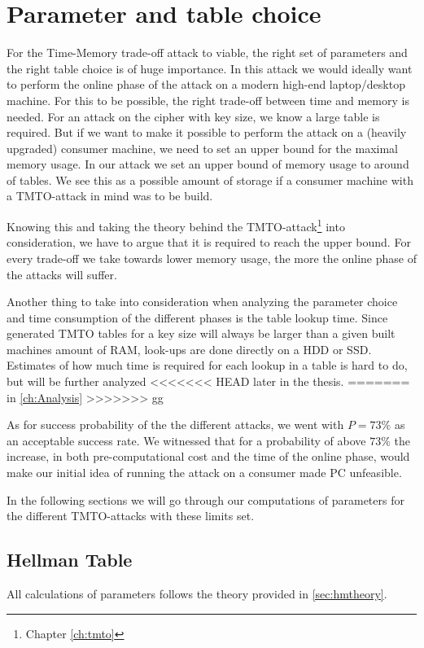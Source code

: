 \chapter{Parameter and table choice}
\label{ch:param}
For the Time-Memory trade-off attack to viable, the right set of
parameters and the right table choice is of huge importance. In this
attack we would ideally want to perform the online phase of the  attack on a modern
high-end laptop/desktop machine. For this to be possible, the right
trade-off between time and memory is needed. For an attack on the
cipher with  key size, we know a large table is required. But if
we want to make it possible to perform the attack on a (heavily
upgraded) consumer
machine, we need to set an upper bound for the maximal memory
usage. In our attack we set an upper bound of memory usage to around
 of tables. We see this as a possible amount of storage if a
consumer machine with a TMTO-attack in mind was to be build.

Knowing this and taking the theory behind the
TMTO-attack\footnote{Chapter \ref{ch:tmto}} into consideration, we
have to argue that it is required to reach the upper bound. For every
trade-off we take towards lower memory usage, the more the online phase of the
attacks will suffer.

Another thing to take into consideration when analyzing the parameter
choice and time consumption of the different phases is the table lookup
time. Since generated TMTO tables for a  key size will
always be larger than a given built machines amount of RAM, look-ups are
done directly on a HDD or SSD. Estimates of how much time is required
for each lookup in a table is hard to do, but will be further analyzed
<<<<<<< HEAD
later in the thesis.
=======
in \ref{ch:Analysis}
>>>>>>> gg

As for success probability of the
the different attacks, we went with $P = 73\%$ as an acceptable
success rate.
We witnessed that for a probability of above $73\%$ the increase,
in both pre-computational cost and the time of the online phase, would
make our initial idea of running the attack on a consumer made PC
unfeasible.

In the following sections we will go through our computations of
parameters for the different TMTO-attacks with these limits set.

\section{Hellman Table}
All calculations of parameters follows the theory provided in
\ref{sec:hmtheory}.

